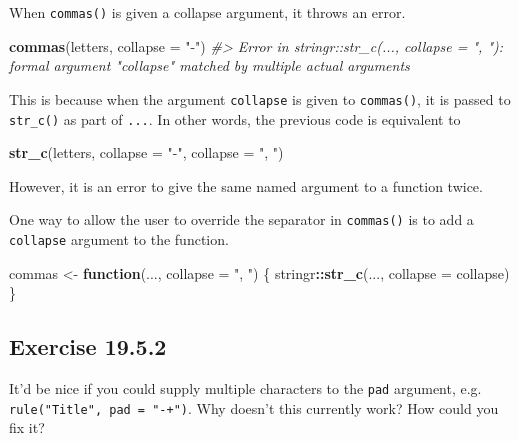 \documentclass[]{book}
\newenvironment{Shaded}{\begin{snugshade}}{\end{snugshade}}
\newcommand{\CommentTok}[1]{\textcolor[rgb]{0.56,0.35,0.01}{\textit{#1}}}
\newcommand{\ControlFlowTok}[1]{\textcolor[rgb]{0.13,0.29,0.53}{\textbf{#1}}}
\newcommand{\DataTypeTok}[1]{\textcolor[rgb]{0.13,0.29,0.53}{#1}}
\newcommand{\KeywordTok}[1]{\textcolor[rgb]{0.13,0.29,0.53}{\textbf{#1}}}
\newcommand{\NormalTok}[1]{#1}
\newcommand{\OperatorTok}[1]{\textcolor[rgb]{0.81,0.36,0.00}{\textbf{#1}}}
\newcommand{\StringTok}[1]{\textcolor[rgb]{0.31,0.60,0.02}{#1}}
\theoremstyle{plain}
\theoremstyle{remark}
\theoremstyle{definition}
\theoremstyle{definition}
\theoremstyle{definition}
\theoremstyle{remark}
\begin{document}
When \texttt{commas()} is given a collapse argument, it throws an error.

\begin{Shaded}
\begin{Highlighting}[]
\KeywordTok{commas}\NormalTok{(letters, }\DataTypeTok{collapse =} \StringTok{"-"}\NormalTok{)}
\CommentTok{#> Error in stringr::str_c(..., collapse = ", "): formal argument "collapse" matched by multiple actual arguments}
\end{Highlighting}
\end{Shaded}

This is because when the argument \texttt{collapse} is given to
\texttt{commas()}, it is passed to \texttt{str\_c()} as part of
\texttt{...}. In other words, the previous code is equivalent to

\begin{Shaded}
\begin{Highlighting}[]
\KeywordTok{str_c}\NormalTok{(letters, }\DataTypeTok{collapse =} \StringTok{"-"}\NormalTok{, }\DataTypeTok{collapse =} \StringTok{", "}\NormalTok{)}
\end{Highlighting}
\end{Shaded}

However, it is an error to give the same named argument to a function
twice.

One way to allow the user to override the separator in \texttt{commas()}
is to add a \texttt{collapse} argument to the function.

\begin{Shaded}
\begin{Highlighting}[]
\NormalTok{commas <-}\StringTok{ }\ControlFlowTok{function}\NormalTok{(..., }\DataTypeTok{collapse =} \StringTok{", "}\NormalTok{) \{}
\NormalTok{  stringr}\OperatorTok{::}\KeywordTok{str_c}\NormalTok{(..., }\DataTypeTok{collapse =}\NormalTok{ collapse)}
\NormalTok{\}}
\end{Highlighting}
\end{Shaded}

\hypertarget{exercise-19.5.2}{%
\subsection*{\texorpdfstring{Exercise
{19.5.2}}{Exercise 19.5.2}}\label{exercise-19.5.2}}

It'd be nice if you could supply multiple characters to the \texttt{pad}
argument, e.g. \texttt{rule("Title",\ pad\ =\ "-+")}. Why doesn't this
currently work? How could you fix it?
\end{document}
